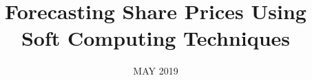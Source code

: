 \documentclass[BTech]{srmuthesis}
\begin{document}
\nocite{thirteen, fifteen, sixteen, seventeen, eighteen, tim, rf, keras, tf, lstm, momoh, lstm1, genetic1, forest123}

\title{Forecasting Share Prices Using Soft Computing Techniques} %

\firstauthorregno{[Reg No:RA1511003010323]}
\secondauthor{}%
\secondauthorregno{}
\thirdauthor{} %
\thirdauthorregno{}
\fourthauthor{}
\fourthauthorregno{}
\fifthauthor{}
\fifthauthorregno{}
\date{MAY 2019} %

\maketitle
\certificate

\end{document}
